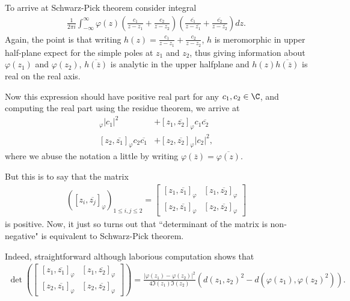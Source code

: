 To arrive at Schwarz-Pick theorem consider integral
\begin{align*}
	\frac{1}{2 \pi i}\int_{-\infty}^{\infty} \varphi(z) \left(\frac{c_{1}}{z - z_{1}} + \frac{c_{2}}{z - z_{2}} \right) \left(\frac{\overline{c_{1}}}{z - \overline{z_{1}}} + \frac{\overline{c_{2}}}{z - \overline{z_{2}}} \right) dz.
\end{align*}
Again, the point is that writing $h(z) = \frac{c_{1}}{z - z_{1}} + \frac{c_{2}}{z - z_{2}}$, $h$ is meromorphic in upper half-plane expect for the simple poles at $z_{1}$ and $z_{2}$, thus giving information about $\varphi(z_{1})$ and $\varphi(z_{2})$, $\overline{h(\overline{z})}$ is analytic in the upper halfplane and $h(z)\overline{h(\overline{z})}$ is real on the real axis.

Now this expression should have positive real part for any $c_{1}, c_{2} \in \C$, and computing the real part using the residue theorem, we arrive at
\begin{align*}
	[z_{1}, \overline{z_{1}}]_{\varphi} |c_{1}|^{2} &+ [z_{1}, \overline{z_{2}}]_{\varphi} c_{1} \overline{c_{2}} \\
	[z_{2}, \overline{z_{1}}]_{\varphi} c_{2} \overline{c_{1}} &+ [z_{2}, \overline{z_{2}}]_{\varphi} |c_{2}|^{2},
\end{align*}
where we abuse the notation a little by writing $\varphi(\overline{z}) = \overline{\varphi(z)}$.

But this is to say that the matrix
\begin{align*}
	\left([z_{i}, \overline{z_{j}}]_{\varphi}\right)_{1 \leq i, j \leq 2} =
	\begin{bmatrix}
		[z_{1}, \overline{z_{1}}]_{\varphi} & [z_{1}, \overline{z_{2}}]_{\varphi} \\
		[z_{2}, \overline{z_{1}}]_{\varphi} & [z_{2}, \overline{z_{2}}]_{\varphi}
	\end{bmatrix}
\end{align*}
is positive. Now, it just so turns out that ``determinant of the matrix is non-negative" is equivalent to Schwarz-Pick theorem.

Indeed, straightforward although laborious computation shows that
\begin{align}\label{pick2_determinant}
	\det\left(
	\begin{bmatrix}
		[z_{1}, \overline{z_{1}}]_{\varphi} & [z_{1}, \overline{z_{2}}]_{\varphi} \\
		[z_{2}, \overline{z_{1}}]_{\varphi} & [z_{2}, \overline{z_{2}}]_{\varphi}
	\end{bmatrix}
	\right)
	=
	\frac{|\varphi(z_{1}) - \varphi(z_{2})|^2}{4 \Im(z_{1}) \Im(z_{2})} \left( d(z_{1}, z_{2})^2 - d(\varphi(z_{1}), \varphi(z_{2})^2)\right).
\end{align}

